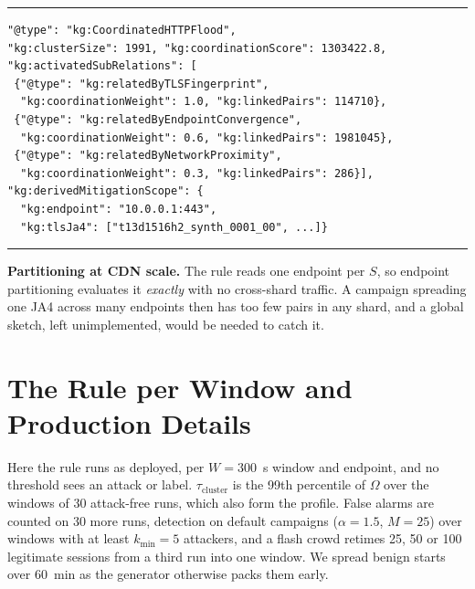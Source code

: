 \documentclass[conference,letterpaper,10pt]{IEEEtran}
\newcommand\1{\textit{(i)}}
\newcommand\2{\textit{(ii)}}
\newcommand\3{\textit{(iii)}}
\newcommand\4{\textit{(iv)}}
\newcommand\5{\textit{(v)}}
\newcommand\6{\textit{(vi)}}
\newcommand\7{\textit{(vii)}}
\newcommand\8{\textit{(viii)}}
\newcommand\9{\textit{(ix)}}
\begin{document}
\begin{listing}[t]
\footnotesize
\hrule\vspace{2pt}
\begin{verbatim}
"@type": "kg:CoordinatedHTTPFlood",
"kg:clusterSize": 1991, "kg:coordinationScore": 1303422.8,
"kg:activatedSubRelations": [
 {"@type": "kg:relatedByTLSFingerprint",
  "kg:coordinationWeight": 1.0, "kg:linkedPairs": 114710},
 {"@type": "kg:relatedByEndpointConvergence",
  "kg:coordinationWeight": 0.6, "kg:linkedPairs": 1981045},
 {"@type": "kg:relatedByNetworkProximity",
  "kg:coordinationWeight": 0.3, "kg:linkedPairs": 286}],
"kg:derivedMitigationScope": {
  "kg:endpoint": "10.0.0.1:443",
  "kg:tlsJa4": ["t13d1516h2_synth_0001_00", ...]}
\end{verbatim}
\vspace{-4pt}\hrule
\caption{Evidence chain of the default campaign ($M = 25$, $K = 1000$), counted in origins, abridged. Endpoint pairs carry $91\%$ of $\Omega$, and the scope lists 25 fingerprints.}
\label{lst:chain}
\end{listing}

\textbf{Partitioning at CDN scale.} The rule reads one endpoint per $S$, so endpoint partitioning evaluates it \textit{exactly} with no cross-shard traffic. A campaign spreading one JA4 across many endpoints then has too few pairs in any shard, and a global sketch, left unimplemented, would be needed to catch it.

\section{The Rule per Window and Production Details}
\label{app:window}

Here the rule runs as deployed, per $W = 300$~s window and endpoint, and no threshold sees an attack or label. $\tau_{\mathrm{cluster}}$ is the 99th
percentile of $\Omega$ over the windows of 30 attack-free runs, which also form the profile. False alarms are counted on 30 more runs, detection on default campaigns ($\alpha = 1.5$, $M = 25$) over windows with at least $k_{\min} = 5$ attackers, and a flash crowd retimes 25, 50 or 100 legitimate sessions from a third run into one window. We spread benign starts over 60~min as the generator otherwise packs them early.
\end{document}
